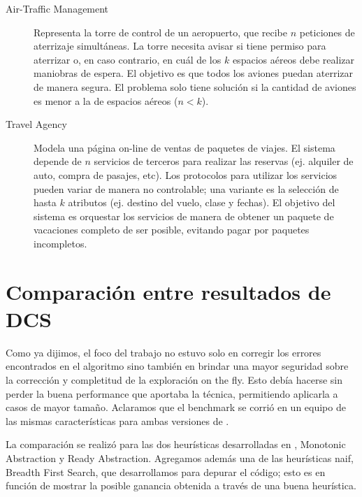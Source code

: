 \begin{description}
    \item [Air-Traffic Management] Representa la torre de control de un aeropuerto, que recibe $n$ peticiones de aterrizaje simultáneas. La torre necesita avisar si tiene permiso para aterrizar o, en caso contrario, en cuál de los $k$ espacios aéreos debe realizar maniobras de espera. El objetivo es que todos los aviones puedan aterrizar de manera segura. El problema solo tiene solución si la cantidad de aviones es menor a la de espacios aéreos ($n<k$).
    
    \item [Travel Agency] Modela una página on-line de ventas de paquetes de viajes. El sistema depende de $n$ servicios de terceros para realizar las reservas (ej. alquiler de auto, compra de pasajes, etc). Los protocolos para utilizar los servicios pueden variar de manera no controlable; una variante es la selección de hasta $k$ atributos (ej. destino del vuelo, clase y fechas). El objetivo del sistema es orquestar los servicios de manera de obtener un paquete de vacaciones completo de ser posible, evitando pagar por paquetes incompletos.
\end{description}

\section{Comparación entre resultados de DCS}
Como ya dijimos, el foco del trabajo no estuvo solo en corregir los errores encontrados en el algoritmo sino también en brindar una mayor seguridad sobre la corrección y completitud de la exploración on the fly. Esto debía hacerse sin perder la buena performance que aportaba la técnica, permitiendo aplicarla a casos de mayor tamaño. Aclaramos que el benchmark se corrió en un equipo de las mismas características para ambas versiones de \DCS.

La comparación se realizó para las dos heurísticas desarrolladas en \cite{tesisDani}, Monotonic Abstraction y Ready Abstraction. Agregamos además una de las heurísticas naif, Breadth First Search, que desarrollamos para depurar el código; esto es en función de mostrar la posible ganancia obtenida a través de una buena heurística.

